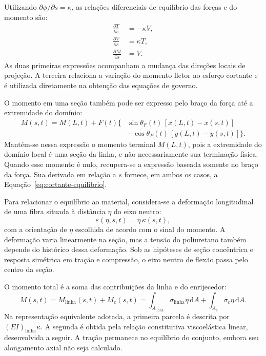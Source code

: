 \documentclass[arial,centeredequations,english,brazilian,oneside,section=TITLE]{ifes8}
\begin{document}
Utilizando $\partial\phi/\partial s=\kappa$, as relações diferenciais de
equilíbrio das forças e do momento são:
\begin{align}
  \frac{\partial T}{\partial s}&=-\kappa V,
    \label{eq:equilibrio-diferencial-tracao}\\
  \frac{\partial V}{\partial s}&=\kappa T,
    \label{eq:equilibrio-diferencial-cortante}\\
  \frac{\partial M}{\partial s}&=V.
    \label{eq:equilibrio-diferencial-momento}
\end{align}
As duas primeiras expressões acompanham a mudança das direções locais de
projeção. A terceira relaciona a variação do momento fletor ao esforço cortante
e é utilizada diretamente na obtenção das equações de governo.

O momento em uma seção também pode ser expresso pelo braço da força até
a extremidade do domínio:
\begin{equation}
  \begin{aligned}
    M(s,t)=M(L,t)+F(t)\bigl\{&
      \sin\theta_F(t)\,[x(L,t)-x(s,t)]\\
      &-\cos\theta_F(t)\,[y(L,t)-y(s,t)]\bigr\}.
  \end{aligned}
  \label{eq:momento-braco-forca}
\end{equation}
Mantém-se nessa expressão o momento terminal $M(L,t)$, pois a extremidade do
domínio local é uma seção da linha, e não necessariamente sua terminação física.
Quando esse momento é nulo, recupera-se a expressão baseada somente no braço
da força. Sua derivada em relação a $s$ fornece, em ambos os casos,
a Equação~\eqref{eq:cortante-equilibrio}.

Para relacionar o equilíbrio ao material, considera-se a deformação longitudinal
de uma fibra situada à distância $\eta$ do eixo neutro:
\begin{equation}
  \varepsilon(\eta,s,t)=\eta\,\kappa(s,t),
  \label{eq:deformacao-fibra-metodologia}
\end{equation}
com a orientação de $\eta$ escolhida de acordo com o sinal do momento. A
deformação varia linearmente na seção, mas a tensão do poliuretano também
depende do histórico dessa deformação. Sob as hipóteses de seção concêntrica
e resposta simétrica em tração e compressão, o eixo neutro de flexão passa
pelo centro da seção.

O momento total é a soma das contribuições da linha e do enrijecedor:
\begin{equation}
  M(s,t)=M_{\mathrm{linha}}(s,t)+M_e(s,t)
  =\int_{A_{\mathrm{linha}}}\sigma_{\mathrm{linha}}\eta\,\mathrm{d}A
   +\int_{A_e}\sigma_e\eta\,\mathrm{d}A.
  \label{eq:momento-soma-componentes}
\end{equation}
Na representação equivalente adotada, a primeira parcela é descrita por
$(EI)_{\mathrm{linha}}\kappa$. A segunda é obtida pela relação constitutiva
viscoelástica linear, desenvolvida a seguir. A tração permanece no equilíbrio
do conjunto, embora seu alongamento axial não seja calculado.
\end{document}
